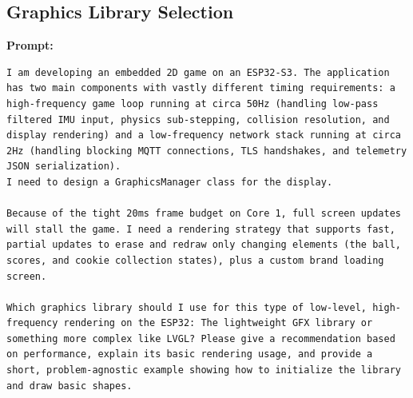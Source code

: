 \subsection*{Graphics Library Selection}

\textbf{Prompt:}
\begin{lstlisting}[language={}, breaklines=true]
I am developing an embedded 2D game on an ESP32-S3. The application has two main components with vastly different timing requirements: a high-frequency game loop running at circa 50Hz (handling low-pass filtered IMU input, physics sub-stepping, collision resolution, and display rendering) and a low-frequency network stack running at circa 2Hz (handling blocking MQTT connections, TLS handshakes, and telemetry JSON serialization).
I need to design a GraphicsManager class for the display.

Because of the tight 20ms frame budget on Core 1, full screen updates will stall the game. I need a rendering strategy that supports fast, partial updates to erase and redraw only changing elements (the ball, scores, and cookie collection states), plus a custom brand loading screen.

Which graphics library should I use for this type of low-level, high-frequency rendering on the ESP32: The lightweight GFX library or something more complex like LVGL? Please give a recommendation based on performance, explain its basic rendering usage, and provide a short, problem-agnostic example showing how to initialize the library and draw basic shapes.
\end{lstlisting}

